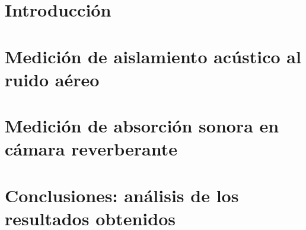 \documentclass[10pt,a4paper]{article}
\begin{document}
		
	
\tableofcontents
\newpage
\setcounter{page}{1}


\section{Introducción}
	

\section{Medición de aislamiento acústico al ruido aéreo}
	

\section{Medición de absorción sonora en cámara reverberante}
	

\section{Conclusiones: análisis de los resultados obtenidos}
	


%		
%
\end{document}
